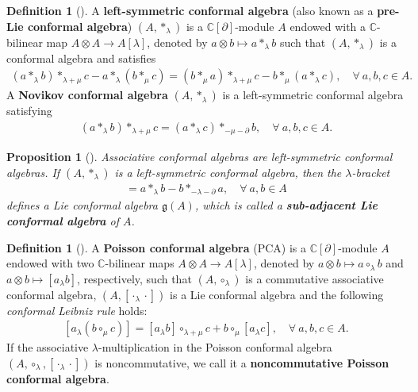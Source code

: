 \documentclass[11pt,letterpaper,reqno]{amsart}
\newtheorem{proposition}[theorem]{Proposition}
\theoremstyle{definition}
\newtheorem{definition}[theorem]{Definition}
\numberwithin{equation}{section}
\begin{document}
\begin{definition}[\cite{Kac98}]
A {\bf left-symmetric conformal algebra} (also known as a {\bf pre-Lie conformal algebra}) $(A,\ast_\lambda)$ is a $\mathbb{C}[\partial]$-module $A$ endowed with a $\mathbb{C}$-bilinear map $A\otimes A\to A[\lambda]$, denoted by $a\otimes b\mapsto a \ast_{\lambda}b$ such that $(A,\ast_\lambda)$ is a conformal algebra and satisfies %
   \begin{align}
        (a\ast_\lambda b)\ast_{\lambda+\mu}c-a\ast_\lambda(b\ast_\mu c)=(b\ast_\mu a)\ast_{\lambda+\mu}c-b\ast_\mu(a\ast_\lambda c),\quad \forall ~a,b,c\in {A}.
   \end{align}
A {\bf Novikov conformal algebra} $(A,\ast_\lambda)$ is a left-symmetric conformal algebra satisfying
   \begin{align}
      (a\ast_\lambda b)\ast_{\lambda+\mu}c=(a\ast_\lambda c)\ast_{-\mu-\partial}b,\quad \forall ~a,b,c\in {A}.
   \end{align}
\end{definition}

\begin{proposition}[{\cite{HL15}}] \label{propo1}
   Associative conformal algebras are left-symmetric conformal algebras. If $(A,\ast_\lambda)$ is a left-symmetric conformal algebra, then the $\lambda$-bracket
   \begin{align*}
      [a_\lambda b]=a\ast_\lambda b-b\ast_{-\lambda-\partial}a,\quad \forall~ a,b \in {A}
   \end{align*}
   defines a Lie conformal algebra $\mathfrak{g}(A)$, which is called a \textbf{sub-adjacent Lie conformal algebra} of $A$.
\end{proposition}

\begin{definition}[{\cite{LZ23}}]
A \textbf{Poisson conformal algebra} (PCA) is a $\mathbb{C}[\partial]$-module $A$ endowed with two $\mathbb{C}$-bilinear maps $A \otimes A \rightarrow A[\lambda]$, denoted by $a\otimes b\mapsto a \circ_{\lambda}b$ and $a\otimes b\mapsto [a_{\lambda}b]$, respectively, such that $(A,\circ_\lambda)$ is a {commutative associative conformal algebra}, $(A,[{\cdot_ \lambda \cdot}])$ is a {Lie conformal algebra} and the following \emph{conformal Leibniz rule} holds:
   \begin{align}\label{rule1}
      [a_{\lambda}(b\circ_{\mu}c)]=[a_{\lambda}b]\circ_{\lambda+\mu}c+b\circ_{\mu}[a_{\lambda}c],\quad\forall~ a,b,c\in A.		
   \end{align}
If the associative $\lambda$-multiplication in the Poisson conformal algebra $(A,\circ_{\lambda},[{\cdot_ \lambda \cdot}])$ is noncommutative, we call it a {\textbf{noncommutative Poisson conformal algebra}}.
\end{definition}%
\end{document}
